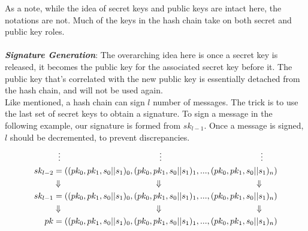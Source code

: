 \documentclass[]{scrartcl}
\makeatletter
\newcommand{\mathcenter}{\@fleqnfalse}
\makeatother
\begin{document}
As a note, while the idea of secret keys and public keys are intact here, the notations are not. Much of the keys in the hash chain take on both secret and public key roles. \\ \\
\textbf{\textit{Signature Generation}}: The overarching idea here is once a secret key is released, it becomes the public key for the associated secret key before it. The public key that's correlated with the new public key is essentially detached from the hash chain, and will not be used again.\\
Like mentioned, a hash chain can sign $l$ number of messages. The trick is to use the last set of secret keys to obtain a signature. To sign a message in the following example, our signature is formed from $sk_{l-1}$. Once a message is signed, $l$ should be decremented, to prevent discrepancies. 
\mathcenter
\begin{equation}
\begin{split}
& \hspace{0.2cm}\vdots \hspace{4.15cm}\vdots \hspace{4.15cm}\vdots \\
sk_{l-2} & = ((pk_0, pk_1, s_0||s_1)_0,(pk_0, pk_1, s_0||s_1)_1,...,(pk_0, pk_1, s_0||s_1)_n) \\
& \Downarrow \hspace{4cm}\Downarrow \hspace{4cm}\Downarrow \\
sk_{l-1} & = ((pk_0, pk_1, s_0||s_1)_0,(pk_0, pk_1, s_0||s_1)_1,...,(pk_0, pk_1, s_0||s_1)_n) \\
& \Downarrow \hspace{4cm}\Downarrow \hspace{4cm}\Downarrow \\
pk & = ((pk_0, pk_1, s_0||s_1)_0,(pk_0, pk_1, s_0||s_1)_1,...,(pk_0, pk_1, s_0||s_1)_n) \\
\end{split}
\end{equation}
\end{document}
